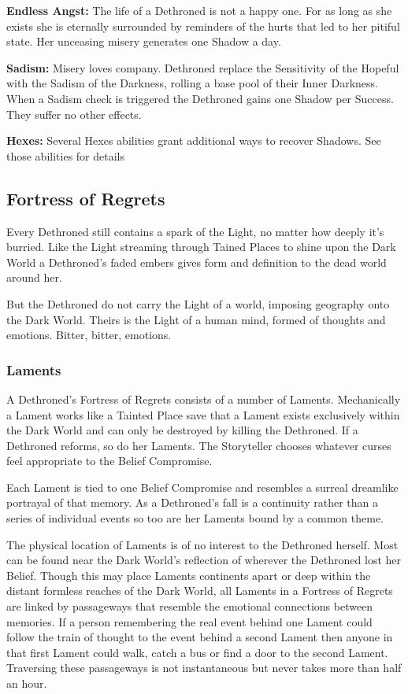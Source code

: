 \noindent \textbf{Endless Angst:} The life of a Dethroned is not a happy one. For as long as she exists she is eternally surrounded by reminders of the hurts that led to her pitiful state. Her unceasing misery generates one Shadow a day.

\noindent \textbf{Sadism:} Misery loves company. Dethroned replace the Sensitivity of the Hopeful with the Sadism of the Darkness, rolling a base pool of their Inner Darkness. When a Sadism check is triggered the Dethroned gains one Shadow per Success. They suffer no other effects.

\noindent \textbf{Hexes:} Several Hexes abilities grant additional ways to recover Shadows. See those abilities for details 

\subsection*{Fortress of Regrets}

Every Dethroned still contains a spark of the Light, no matter how deeply it's burried. Like the Light streaming through Tained Places to shine upon the Dark World a Dethroned's faded embers gives form and definition to the dead world around her.

But the Dethroned do not carry the Light of a world, imposing geography onto the Dark World. Theirs is the Light of a human mind, formed of thoughts and emotions. Bitter, bitter, emotions.

\subsubsection*{Laments}

A Dethroned's Fortress of Regrets consists of a number of Laments. Mechanically a Lament works like a Tainted Place save that a Lament exists exclusively within the Dark World and can only be destroyed by killing the Dethroned. If a Dethroned reforms, so do her Laments. The Storyteller chooses whatever curses feel appropriate to the Belief Compromise.

Each Lament is tied to one Belief Compromise and resembles a surreal dreamlike portrayal of that memory. As a Dethroned's fall is a continuity rather than a series of individual events so too are her Laments bound by a common theme.

The physical location of Laments is of no interest to the Dethroned herself. Most can be found near the Dark World's reflection of wherever the Dethroned lost her Belief. Though this may place Laments continents apart or deep within the distant formless reaches of the Dark World, all Laments in a Fortress of Regrets are linked by passageways that resemble the emotional connections between memories. If a person remembering the real event behind one Lament could follow the train of thought to the event behind a second Lament then anyone in that first Lament could walk, catch a bus or find a door to the second Lament. Traversing these passageways is not instantaneous but never takes more than half an hour. 

